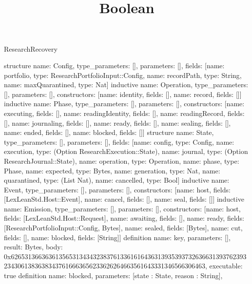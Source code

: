 \begin{lexlean}{ResearchRecovery}
\title{Boolean}
\begin{semanticmodule}
structure{
 name: Config,
 type_parameters: [],
 parameters: [],
 fields: [{name: portfolio, type: ResearchPortfolioInput::Config}, {name: recordPath, type: String}, {name: maxQuarantined, type: Nat}]
}
inductive{
 name: Operation,
 type_parameters: [],
 parameters: [],
 constructors: [{name: identity, fields: []}, {name: record, fields: []}]
}
inductive{
 name: Phase,
 type_parameters: [],
 parameters: [],
 constructors: [{name: executing, fields: []}, {name: readingIdentity, fields: []}, {name: readingRecord, fields: []}, {name: journaling, fields: []}, {name: ready, fields: []}, {name: sealing, fields: []}, {name: ended, fields: []}, {name: blocked, fields: []}]
}
structure{
 name: State,
 type_parameters: [],
 parameters: [],
 fields: [{name: config, type: Config}, {name: execution, type: (Option ResearchExecution::State)}, {name: journal, type: (Option ResearchJournal::State)}, {name: operation, type: Operation}, {name: phase, type: Phase}, {name: expected, type: Bytes}, {name: generation, type: Nat}, {name: quarantined, type: (List Nat)}, {name: cancelled, type: Bool}]
}
inductive{
 name: Event,
 type_parameters: [],
 parameters: [],
 constructors: [{name: host, fields: [LexLeanStd.Host::Event]}, {name: cancel, fields: []}, {name: seal, fields: []}]
}
inductive{
 name: Emission,
 type_parameters: [],
 parameters: [],
 constructors: [{name: host, fields: [LexLeanStd.Host::Request]}, {name: awaiting, fields: []}, {name: ready, fields: [ResearchPortfolioInput::Config, Bytes]}, {name: sealed, fields: [Bytes]}, {name: cut, fields: []}, {name: blocked, fields: [String]}]
}
definition{
 name: key,
 parameters: [],
 result: Bytes,
 body: 0x62653136636361356531343432383761336161643631393539373263663139376239323430613836383437616663656233626264663561643331346566306463,
 executable: true
}
definition{
 name: blocked,
 parameters: [state : State, reason : String],
}
\end{semanticmodule}
\end{lexlean}

